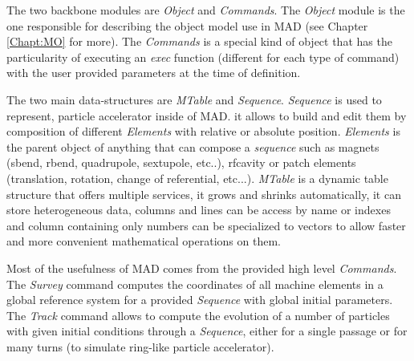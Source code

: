 The two backbone modules are \emph{Object} and \emph{Commands}. The \emph{Object}
module is the one responsible for describing the object model use in MAD (see
Chapter \ref{Chapt:MO} for more). The \emph{Commands} is a special kind of
object that has the particularity of executing an \emph{exec} function
(different for each type of command) with the user provided parameters at the
time of definition.

The two main data-structures are \emph{MTable} and \emph{Sequence}.
\emph{Sequence} is used to represent, particle accelerator inside of MAD.
it allows to build and edit them by
composition of different \emph{Elements} with relative or absolute position.
\emph{Elements} is the parent object of anything that can compose a
\emph{sequence} such as magnets (sbend, rbend, quadrupole, sextupole, etc..),
rfcavity or patch elements (translation, rotation, change of referential,
etc...). \emph{MTable} is a dynamic table structure that offers multiple
services, it grows and shrinks automatically, it can store heterogeneous data,
columns and lines can be access by name or indexes and column containing only
numbers can be specialized to vectors to allow faster and more convenient
mathematical operations on them.

Most of the usefulness of MAD comes from the provided high level \emph{Commands}.
The \emph{Survey} command computes the coordinates of all machine elements in a
global reference system for a provided \emph{Sequence} with global initial
parameters. The \emph{Track} command allows to compute the evolution of a number
of particles with given initial conditions through a \emph{Sequence}, either for
a single passage or for many turns (to simulate ring-like particle accelerator).